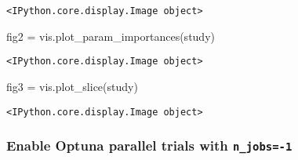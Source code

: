 \documentclass[
  letterpaper,
  DIV=11,
  numbers=noendperiod]{scrreprt}
\newenvironment{Shaded}{\begin{snugshade}}{\end{snugshade}}
\newcommand{\NormalTok}[1]{\textcolor[rgb]{0.00,0.23,0.31}{#1}}
\newcommand{\OperatorTok}[1]{\textcolor[rgb]{0.37,0.37,0.37}{#1}}
\begin{document}
\begin{verbatim}
<IPython.core.display.Image object>
\end{verbatim}

\begin{Shaded}
\begin{Highlighting}[]
\NormalTok{fig2 }\OperatorTok{=}\NormalTok{ vis.plot\_param\_importances(study)}
\end{Highlighting}
\end{Shaded}

\begin{verbatim}
<IPython.core.display.Image object>
\end{verbatim}

\begin{Shaded}
\begin{Highlighting}[]
\NormalTok{fig3 }\OperatorTok{=}\NormalTok{ vis.plot\_slice(study)}
\end{Highlighting}
\end{Shaded}

\begin{verbatim}
<IPython.core.display.Image object>
\end{verbatim}

\subsubsection{\texorpdfstring{Enable Optuna parallel trials with
\texttt{n\_jobs=-1}}{Enable Optuna parallel trials with n\_jobs=-1}}\label{enable-optuna-parallel-trials-with-n_jobs-1}
\end{document}
